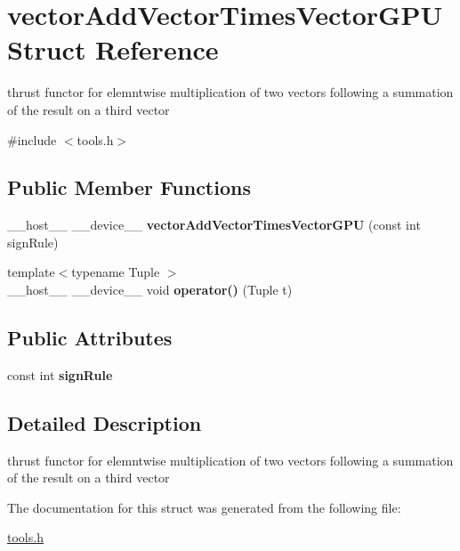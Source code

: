 \hypertarget{structvector_add_vector_times_vector_g_p_u}{}\section{vector\+Add\+Vector\+Times\+Vector\+G\+PU Struct Reference}
\label{structvector_add_vector_times_vector_g_p_u}


thrust functor for elemntwise multiplication of two vectors following a summation of the result on a third vector  




{\ttfamily \#include $<$tools.\+h$>$}

\subsection*{Public Member Functions}
\begin{DoxyCompactItemize}
\item 
\mbox{\label{structvector_add_vector_times_vector_g_p_u_abaad725feda316fd2ae3263793e6dfaa}} 
\+\_\+\+\_\+host\+\_\+\+\_\+ \+\_\+\+\_\+device\+\_\+\+\_\+ {\bfseries vector\+Add\+Vector\+Times\+Vector\+G\+PU} (const int sign\+Rule)
\item 
\mbox{\label{structvector_add_vector_times_vector_g_p_u_a6860a5fa42b72e7c20f4b2afa71a7ec9}} 
{\footnotesize template$<$typename Tuple $>$ }\\\+\_\+\+\_\+host\+\_\+\+\_\+ \+\_\+\+\_\+device\+\_\+\+\_\+ void {\bfseries operator()} (Tuple t)
\end{DoxyCompactItemize}
\subsection*{Public Attributes}
\begin{DoxyCompactItemize}
\item 
\mbox{\label{structvector_add_vector_times_vector_g_p_u_ae1572bdebd4a20096ad76a7fc2956e2d}} 
const int {\bfseries sign\+Rule}
\end{DoxyCompactItemize}


\subsection{Detailed Description}
thrust functor for elemntwise multiplication of two vectors following a summation of the result on a third vector 

The documentation for this struct was generated from the following file\+:\begin{DoxyCompactItemize}
\item 
\hyperlink{tools_8h}{tools.\+h}\end{DoxyCompactItemize}

